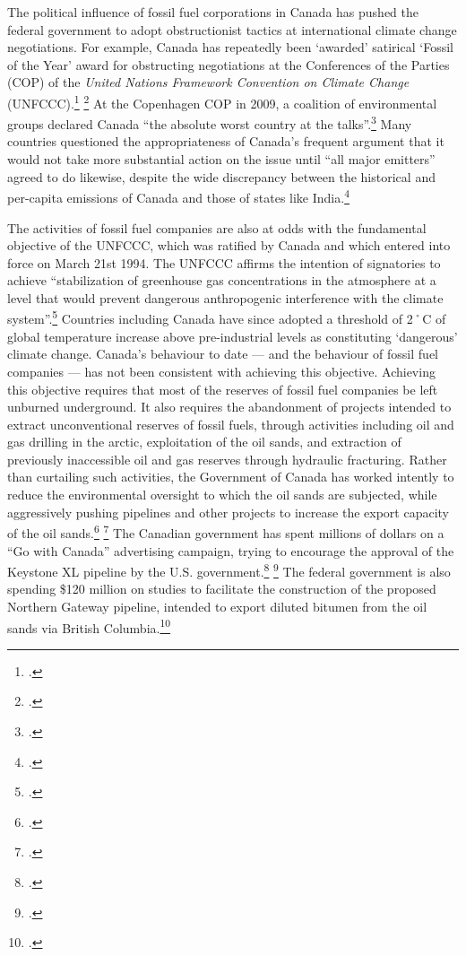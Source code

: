 The political influence of fossil fuel corporations in Canada has pushed the federal government to adopt obstructionist tactics at international climate change negotiations.
For example, Canada has repeatedly been `awarded' satirical `Fossil of the Year' award for obstructing negotiations at the Conferences of the Parties (COP) of the \emph{United Nations Framework Convention on Climate Change} (UNFCCC).\footcite[][]{DurbanFossil} \footcite[See also: ][]{SimpsonBlustering}
At the Copenhagen COP in 2009, a coalition of environmental groups declared Canada ``the absolute worst country at the talks''.\footcite[][]{CBCFossil}
Many countries questioned the appropriateness of Canada's frequent argument that it would not take more substantial action on the issue until ``all major emitters'' agreed to do likewise, despite the wide discrepancy between the historical and per-capita emissions of Canada and those of states like India.\footcite[][]{CanadaWontBudge}






The activities of fossil fuel companies are also at odds with the fundamental objective of the UNFCCC, which was ratified by Canada and which entered into force on March 21st 1994.
The UNFCCC affirms the intention of signatories to achieve ``stabilization of greenhouse gas concentrations in the atmosphere at a level that would prevent dangerous anthropogenic interference with the climate system''.\footcite[][p. 4]{UNFCCC}
Countries including Canada have since adopted a threshold of 2˚C of global temperature increase above pre-industrial levels as constituting `dangerous' climate change.
Canada's behaviour to date --- and the behaviour of fossil fuel companies --- has not been consistent with achieving this objective.
Achieving this objective requires that most of the reserves of fossil fuel companies be left unburned underground.
It also requires the abandonment of projects intended to extract unconventional reserves of fossil fuels, through activities including oil and gas drilling in the arctic, exploitation of the oil sands, and extraction of previously inaccessible oil and gas reserves through hydraulic fracturing.
Rather than curtailing such activities, the Government of Canada has worked intently to reduce the environmental oversight to which the oil sands are subjected, while aggressively pushing pipelines and other projects to increase the export capacity of the oil sands.\footcite[See: ][]{PeterKentTrail} \footcite[][]{HarperSelling2013}
The Canadian government has spent millions of dollars on a ``Go with Canada'' advertising campaign, trying to encourage the approval of the Keystone XL pipeline by the U.S. government.\footcite[][]{HallKeystone2013} \footcite[See also: ][]{AdDetails2013}
The federal government is also spending \$120 million on studies to facilitate the construction of the proposed Northern Gateway pipeline, intended to export diluted bitumen from the oil sands via British Columbia.\footcite[][]{SubsidizingNGP}



